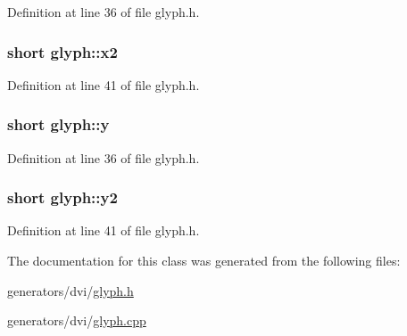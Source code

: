 Definition at line 36 of file glyph.\+h.

\hypertarget{classglyph_a07a7aa840a9a34588a5cc02508ac5e6d}{
\subsubsection[{x2}]{\setlength{\rightskip}{0pt plus 5cm}short glyph\+::x2}}\label{classglyph_a07a7aa840a9a34588a5cc02508ac5e6d}


Definition at line 41 of file glyph.\+h.

\hypertarget{classglyph_ac9b8f10a7be77024f34c723eeea34bf3}{
\subsubsection[{y}]{\setlength{\rightskip}{0pt plus 5cm}short glyph\+::y}}\label{classglyph_ac9b8f10a7be77024f34c723eeea34bf3}


Definition at line 36 of file glyph.\+h.

\hypertarget{classglyph_afa1607f13eb1db99a5a3b1c92d47db7f}{
\subsubsection[{y2}]{\setlength{\rightskip}{0pt plus 5cm}short glyph\+::y2}}\label{classglyph_afa1607f13eb1db99a5a3b1c92d47db7f}


Definition at line 41 of file glyph.\+h.



The documentation for this class was generated from the following files\+:\begin{DoxyCompactItemize}
\item 
generators/dvi/\hyperlink{glyph_8h}{glyph.\+h}\item 
generators/dvi/\hyperlink{glyph_8cpp}{glyph.\+cpp}\end{DoxyCompactItemize}
